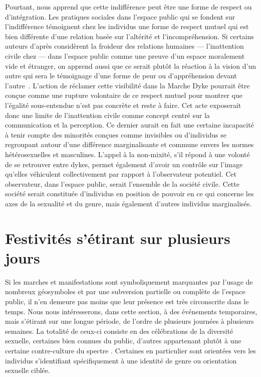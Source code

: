 Pourtant, \citeauthor{Frosh2006} nous apprend que cette indifférence peut être une forme de respect ou d'intégration.
Les pratiques sociales dans l'espace public qui se fondent sur l'indifférence témoignent chez les individus une forme de respect mutuel qui est bien différente d'une relation basée sur l'altérité et l'incompréhension.
Si certains auteurs d'après \citeauthor{Frosh2006} considèrent la froideur des relations humaines --- l'inattention civile chez \citeauthor{Goffman1956} --- dans l'espace public comme une preuve d'un espace moralement vide et étranger, on apprend aussi que ce serait plutôt la réaction à la vision d'un autre qui sera le témoignage d'une forme de peur ou d'appréhension devant l'autre~\citep[279--280]{Frosh2006}.
L'action de réclamer cette visibilité dans la Marche Dyke pourrait être conçue comme une rupture volontaire de ce respect mutuel pour montrer que l'égalité sous-entendue n'est pas concrète et reste à faire.
Cet acte exposerait donc une limite de l'inattention civile comme concept centré sur la communication et la perception.
Ce dernier aurait en fait une certaine incapacité à tenir compte des minorités conçues comme invisibles ou d'individus se regroupant autour d'une différence marginalisante et commune envers les normes hétérosexuelles et masculines.
L'appel à la non-mixité, s'il répond à une volonté de se retrouver entre dykes, permet également d'avoir un contrôle sur l'image qu'elles véhiculent collectivement par rapport à l'observateur potentiel.
Cet observateur, dans l'espace public, serait l'ensemble de la société civile.
Cette société serait constituée d'individus en position de pouvoir en ce qui concerne les axes de la sexualité et du genre, mais également d'autres individus marginalisés.

\section{Festivités s'étirant sur plusieurs jours}
\label{sec:festivitesplusieursjours}
Si les marches et manifestations sont symboliquement marquantes par l'usage de nombreux géosymboles et par une subversion partielle ou complète de l'espace public, il n’en demeure pas moins que leur présence est très circonscrite dans le temps.
Nous nous intéresserons, dans cette section, à des événements temporaires, mais s'étirant sur une longue période, de l'ordre de plusieurs journées à plusieurs semaines.
La totalité de ceux-ci consiste en des célébrations de la diversité sexuelle, certaines bien connues du public, d'autres appartenant plutôt à une certaine contre-culture du spectre \lgbt.
Certaines en particulier sont orientées vers les individus s'identifiant spécifiquement à une identité de genre ou orientation sexuelle ciblée.

